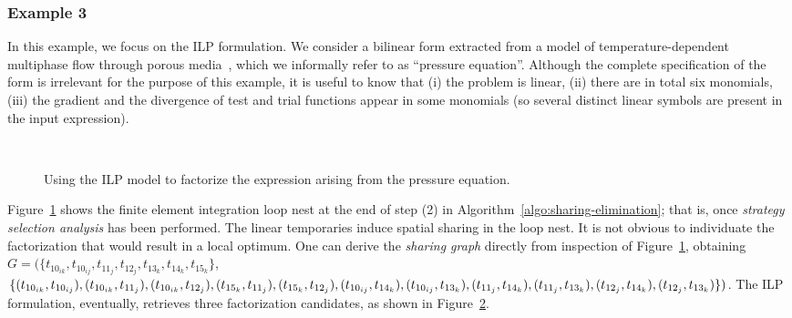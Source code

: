 \subsubsection{Example 3}
In this example, we focus on the ILP formulation. We consider a bilinear form extracted from a model of temperature-dependent multiphase flow through porous media~\citep{quadrature-olegaard}, which we informally refer to as ``pressure equation''. Although the complete specification of the form is irrelevant for the purpose of this example, it is useful to know that (i) the problem is linear, (ii) there are in total six monomials, (iii) the gradient and the divergence of test and trial functions appear in some monomials (so several distinct linear symbols are present in the input expression). 

\begin{figure}[htp]

\begin{subfigure}{\textwidth}

\label{code:pressure_a}
\end{subfigure}
~\\
\begin{subfigure}{\textwidth}

\label{code:pressure_b}
\end{subfigure}

\caption{Using the ILP model to factorize the expression arising from the pressure equation.}
\label{code:pressure}
\end{figure}

Figure~\ref{code:pressure_a} shows the finite element integration loop nest at the end of step (2) in Algorithm~\ref{algo:sharing-elimination}; that is, once {\em strategy selection analysis} has been performed. The linear temporaries induce spatial sharing in the loop nest. It is not obvious to individuate the factorization that would result in a local optimum. One can derive the {\em sharing graph} directly from inspection of Figure~\ref{code:pressure_a}, obtaining $G = (\lbrace t_{10_{ik}}, t_{10_{ij}}, t_{11_{j}}, t_{12_{j}}, t_{13_{k}}, t_{14_{k}}, t_{15_{k}}\rbrace$, $\lbrace (t_{10_{ik}},t_{10_{ij}}), (t_{10_{ik}},t_{11_{j}}), (t_{10_{ik}},t_{12_{j}}), (t_{15_{k}},t_{11_{j}}), (t_{15_{k}},t_{12_{j}}), (t_{10_{ij}},t_{14_{k}}), (t_{10_{ij}},t_{13_{k}}),\\ (t_{11_{j}},t_{14_{k}}), (t_{11_{j}},t_{13_{k}}), (t_{12_{j}},t_{14_{k}}), (t_{12_{j}},t_{13_{k}}) \rbrace)$. The ILP formulation, eventually, retrieves three factorization candidates, as shown in Figure~\ref{code:pressure_b}.

